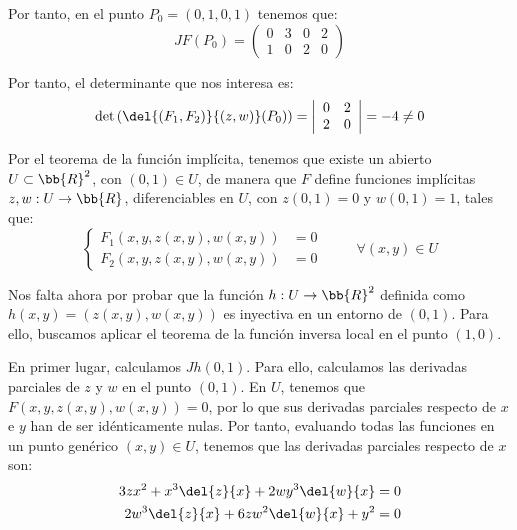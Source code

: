 \begin{ejercicio}
    Por tanto, en el punto $P_0=(0,1,0,1)$ tenemos que:
    \begin{equation*}
        JF(P_0) = \left(
            \begin{array}{cccc}
                0 & 3 & 0 & 2 \\
                1 & 0 & 2 & 0
            \end{array}
        \right)
    \end{equation*}

    Por tanto, el determinante que nos interesa es:
    \begin{equation*}
        \det \left( \del{(F_1,F_2)}{(z,w)}(P_0) \right) =
        \left|
            \begin{array}{cc}
                0 & 2 \\
                2 & 0
            \end{array}
        \right| = -4 \neq 0
    \end{equation*}

    Por el teorema de la función implícita, tenemos que existe un abierto $U\subset \bb{R}^2$,
    con $(0,1)\in U$, de manera que $F$ define funciones implícitas $z,w:U\to \bb{R}$, diferenciables en $U$,
    con $z(0,1)=0$ y $w(0,1)=1$, tales que:
    \begin{equation}
        \left\{
            \begin{array}{ll}
                F_1(x,y,z(x,y),w(x,y)) &= 0 \\
                F_2(x,y,z(x,y),w(x,y)) &= 0
            \end{array}
        \right. \hspace{1cm} \forall (x,y)\in U
    \end{equation}

    Nos falta ahora por probar que la función $h:U\to \bb{R}^2$ definida como $h(x,y)=(z(x,y),w(x,y))$ es inyectiva
    en un entorno de $(0,1)$. Para ello, buscamos aplicar
    el teorema de la función inversa local en el punto $(1,0)$.

    En primer lugar, calculamos $Jh(0,1)$. Para ello, calculamos las derivadas parciales de $z$ y $w$ en el punto $(0,1)$.
    En $U$, tenemos que $F(x,y,z(x,y),w(x,y))=0$, por lo que sus derivadas parciales respecto de $x$ e $y$ han de ser idénticamente nulas.
    Por tanto, evaluando todas las funciones en un punto genérico $(x,y)\in U$, tenemos que las derivadas parciales respecto de $x$ son:
    \begin{align*}
        3zx^2 + x^3\del{z}{x} + 2wy^3\del{w}{x} &= 0 \\
        2w^3\del{z}{x} + 6zw^2\del{w}{x} +y^2&= 0
    \end{align*}


\end{ejercicio}
